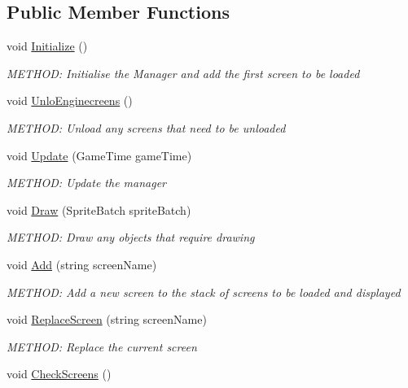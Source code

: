 \subsection*{Public Member Functions}
\begin{DoxyCompactItemize}
\item 
void \hyperlink{a00470_ae37c13c038cdb202262013731985eb10}{Initialize} ()
\begin{DoxyCompactList}\small\item\em M\+E\+T\+H\+OD\+: Initialise the Manager and add the first screen to be loaded \end{DoxyCompactList}\item 
void \hyperlink{a00470_a8d30874c7b1b2728a784de0c6e6f80e3}{Unlo\+Enginecreens} ()
\begin{DoxyCompactList}\small\item\em M\+E\+T\+H\+OD\+: Unload any screens that need to be unloaded \end{DoxyCompactList}\item 
void \hyperlink{a00470_afc42708b653397ca8a3a81dc8d244c61}{Update} (Game\+Time game\+Time)
\begin{DoxyCompactList}\small\item\em M\+E\+T\+H\+OD\+: Update the manager \end{DoxyCompactList}\item 
void \hyperlink{a00470_a28a87245d63c8df1634598b3d20a14cf}{Draw} (Sprite\+Batch sprite\+Batch)
\begin{DoxyCompactList}\small\item\em M\+E\+T\+H\+OD\+: Draw any objects that require drawing \end{DoxyCompactList}\item 
void \hyperlink{a00470_aba0b8f29600dabc2a55dde4d5e00c7bc}{Add} (string screen\+Name)
\begin{DoxyCompactList}\small\item\em M\+E\+T\+H\+OD\+: Add a new screen to the stack of screens to be loaded and displayed \end{DoxyCompactList}\item 
void \hyperlink{a00470_aaa6bfa9a986729ada7dcea6ac40f078d}{Replace\+Screen} (string screen\+Name)
\begin{DoxyCompactList}\small\item\em M\+E\+T\+H\+OD\+: Replace the current screen \end{DoxyCompactList}\item 
void \hyperlink{a00470_a40fbf0a98c186ba93837f6279ad2f7dd}{Check\+Screens} ()

\end{DoxyCompactItemize}
